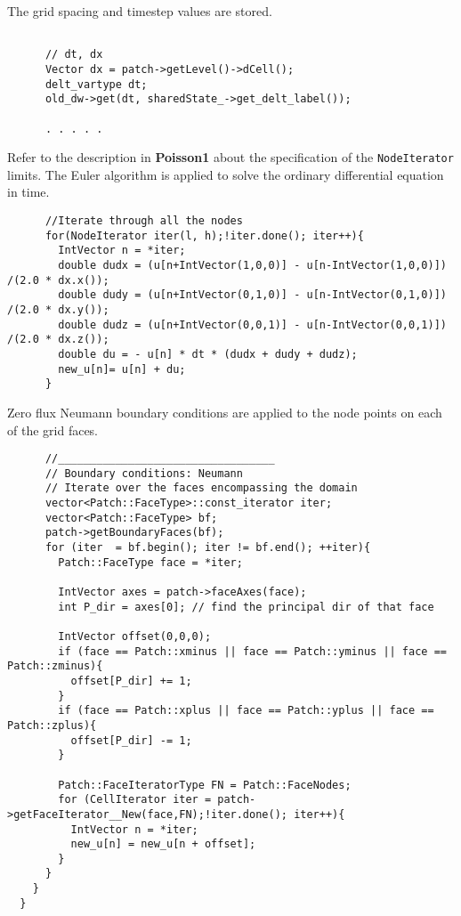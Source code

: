 \documentclass[11pt,fleqn]{book} %
\begin{document}
    The grid spacing and timestep values are stored.

    \begin{lstlisting}

      // dt, dx
      Vector dx = patch->getLevel()->dCell();
      delt_vartype dt;
      old_dw->get(dt, sharedState_->get_delt_label());
      
      . . . . .  
    \end{lstlisting}

    Refer to the description in \textbf{Poisson1} about the specification
    of the \texttt{NodeIterator} limits.  The Euler algorithm is applied to solve
    the ordinary differential equation in time.

    \begin{lstlisting}                   
      //Iterate through all the nodes
      for(NodeIterator iter(l, h);!iter.done(); iter++){    
        IntVector n = *iter;
        double dudx = (u[n+IntVector(1,0,0)] - u[n-IntVector(1,0,0)]) /(2.0 * dx.x());
        double dudy = (u[n+IntVector(0,1,0)] - u[n-IntVector(0,1,0)]) /(2.0 * dx.y());
        double dudz = (u[n+IntVector(0,0,1)] - u[n-IntVector(0,0,1)]) /(2.0 * dx.z());
        double du = - u[n] * dt * (dudx + dudy + dudz);
        new_u[n]= u[n] + du;
      }

    \end{lstlisting}

    Zero flux Neumann boundary conditions are applied to the node points
    on each of the grid faces.


    \begin{lstlisting}
      //__________________________________
      // Boundary conditions: Neumann
      // Iterate over the faces encompassing the domain
      vector<Patch::FaceType>::const_iterator iter;
      vector<Patch::FaceType> bf;
      patch->getBoundaryFaces(bf);
      for (iter  = bf.begin(); iter != bf.end(); ++iter){
        Patch::FaceType face = *iter;

        IntVector axes = patch->faceAxes(face);
        int P_dir = axes[0]; // find the principal dir of that face

        IntVector offset(0,0,0);
        if (face == Patch::xminus || face == Patch::yminus || face == Patch::zminus){
          offset[P_dir] += 1; 
        }
        if (face == Patch::xplus || face == Patch::yplus || face == Patch::zplus){
          offset[P_dir] -= 1;
        }

        Patch::FaceIteratorType FN = Patch::FaceNodes;
        for (CellIterator iter = patch->getFaceIterator__New(face,FN);!iter.done(); iter++){
          IntVector n = *iter;
          new_u[n] = new_u[n + offset];
        }
      }
    }
  }

\end{lstlisting}
\end{document}
